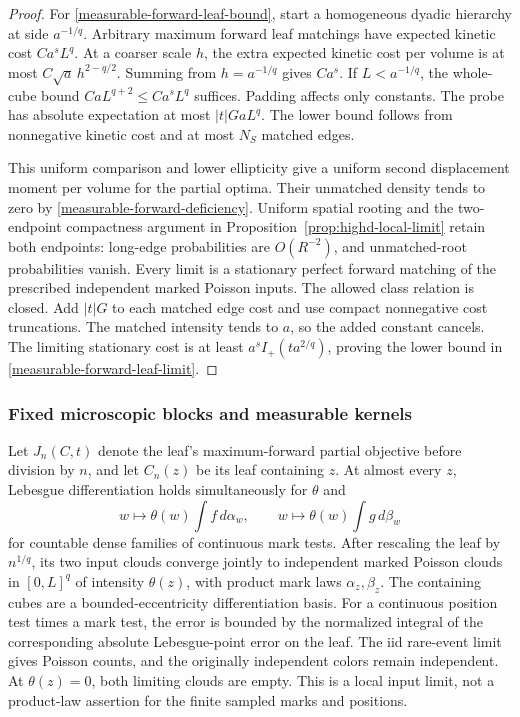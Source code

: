 \documentclass[11pt,reqno]{amsart}
\theoremstyle{definition}
\theoremstyle{remark}
\numberwithin{equation}{section}
\begin{document}
\begin{proof}
For \eqref{measurable-forward-leaf-bound}, start a homogeneous dyadic
hierarchy at side \(a^{-1/q}\). Arbitrary maximum forward leaf
matchings have expected kinetic cost \(C a^sL^q\). At a coarser
scale \(h\), the extra expected kinetic cost per volume is at most
\(C\sqrt a\,h^{2-q/2}\). Summing from \(h=a^{-1/q}\) gives
\(Ca^s\). If \(L<a^{-1/q}\), the whole-cube bound
\(CaL^{q+2}\le Ca^sL^q\) suffices. Padding affects only constants.
The probe has absolute expectation at most \(|t|GaL^q\).
The lower bound follows from nonnegative kinetic cost and at most
\(N_S\) matched edges.

This uniform comparison and lower ellipticity give a uniform second
displacement moment per volume for the partial optima.
Their unmatched density tends to zero by
\eqref{measurable-forward-deficiency}. Uniform spatial rooting and
the two-endpoint compactness argument in
Proposition~\ref{prop:highd-local-limit} retain both endpoints:
long-edge probabilities are \(O(R^{-2})\), and unmatched-root
probabilities vanish. Every limit is a stationary perfect forward
matching of the prescribed independent marked Poisson inputs.
The allowed class relation is closed. Add \(|t|G\) to each matched
edge cost and use compact nonnegative cost truncations. The matched
intensity tends to \(a\), so the added constant cancels. The limiting
stationary cost is at least \(a^s I_+(ta^{2/q})\), proving the
lower bound in \eqref{measurable-forward-leaf-limit}.
\end{proof}

\subsubsection{Fixed microscopic blocks and measurable kernels}

Let \(J_n(C,t)\) denote the leaf's maximum-forward partial objective
before division by \(n\), and let \(C_n(z)\) be its leaf containing \(z\).
At almost every \(z\), Lebesgue differentiation holds simultaneously for
\(\theta\) and
\[
 w\longmapsto\theta(w)\int f\,d\alpha_w,\qquad
 w\longmapsto\theta(w)\int g\,d\beta_w
\]
for countable dense families of continuous mark tests.
After rescaling the leaf by \(n^{1/q}\), its two input clouds converge
jointly to independent marked Poisson clouds in \([0,L]^q\) of
intensity \(\theta(z)\), with product mark laws \(\alpha_z,\beta_z\).
The containing cubes are a bounded-eccentricity differentiation basis.
For a continuous position test times a mark test, the error is bounded
by the normalized integral of the corresponding absolute Lebesgue-point
error on the leaf. The iid rare-event limit gives Poisson counts, and
the originally independent colors remain independent.
At \(\theta(z)=0\), both limiting clouds are empty.
This is a local input limit, not a product-law assertion for the
finite sampled marks and positions.
\end{document}
